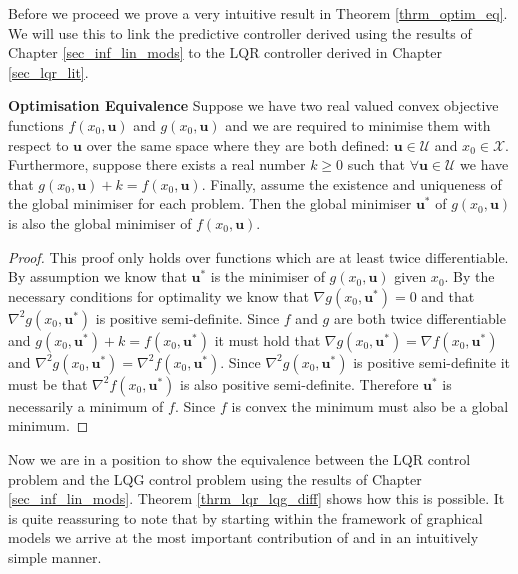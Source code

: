 Before we proceed we prove a very intuitive result in Theorem \ref{thrm_optim_eq}. We will use this to link the predictive controller derived using the results of Chapter \ref{sec_inf_lin_mods} to the LQR controller derived in Chapter \ref{sec_lqr_lit}.
\begin{thrm}
\textbf{Optimisation Equivalence} Suppose we have two real valued convex objective functions $f(x_0,\mathbf{u})$ and $g(x_0, \mathbf{u})$ and we are required to minimise them with respect to $\mathbf{u}$ over the same space where they are both defined: $\mathbf{u}\in \mathcal{U}$ and $x_0 \in \mathcal{X}$. Furthermore, suppose there exists a real number $k \geq 0$ such that $\forall \mathbf{u} \in \mathcal{U}$ we have that $g(x_0, \mathbf{u}) + k = f(x_0, \mathbf{u})$. Finally, assume the existence and uniqueness of the global minimiser for each problem. Then the global minimiser $\mathbf{u}^*$ of $g(x_0, \mathbf{u})$ is also the global minimiser of $f(x_0, \mathbf{u})$.
\label{thrm_optim_eq}
\end{thrm}
\begin{proof}
This proof only holds over functions which are at least twice differentiable. By assumption we know that $\mathbf{u}^*$ is the minimiser of $g(x_0, \mathbf{u})$ given $x_0$. By the necessary conditions for optimality \cite{forst} we know that $\nabla g(x_0, \mathbf{u}^*) = 0$ and that $\nabla ^2 g(x_0, \mathbf{u}^*)$ is positive semi-definite. Since $f$ and $g$ are both twice differentiable and  $g(x_0, \mathbf{u}^*) + k = f(x_0, \mathbf{u}^*)$ it must hold that $\nabla g(x_0, \mathbf{u}^*) = \nabla f(x_0, \mathbf{u}^*)$ and  $\nabla ^2 g(x_0, \mathbf{u}^*) = \nabla ^2 f(x_0, \mathbf{u}^*)$. Since $\nabla ^2 g(x_0, \mathbf{u}^*)$ is positive semi-definite it must be that $\nabla ^2 f(x_0, \mathbf{u}^*)$ is also positive semi-definite. Therefore $\mathbf{u}^*$ is necessarily a minimum of $f$. Since $f$ is convex the minimum must also be a global minimum.
\end{proof}
Now we are in a position to show the equivalence between the LQR control problem and the LQG control problem using the results of Chapter \ref{sec_inf_lin_mods}. Theorem \ref{thrm_lqr_lqg_diff} shows how this is possible. It is quite reassuring to note that by starting within the framework of graphical models we arrive at the most important contribution of \cite{yan1} and \cite{yan2} in an intuitively simple manner.
